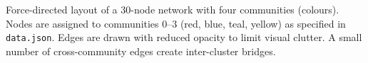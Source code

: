 \caption{Force-directed layout of a 30-node network with four communities (colours). Nodes are assigned to communities 0--3 (red, blue, teal, yellow) as specified in \texttt{data.json}. Edges are drawn with reduced opacity to limit visual clutter. A small number of cross-community edges create inter-cluster bridges.}
